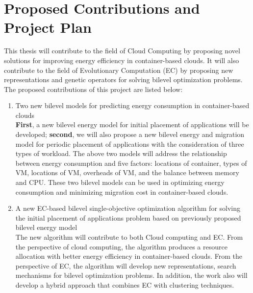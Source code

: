 \chapter{Proposed Contributions and Project Plan}\label{C:con}

This thesis will contribute to the field of Cloud Computing by proposing novel solutions for improving energy efficiency in container-based clouds. It will also contribute to the field of Evolutionary Computation (EC) by proposing new representations and genetic operators for solving bilevel optimization problems. The proposed contributions of this project are listed below:
 
\begin{enumerate}
	\item Two new bilevel models for predicting energy consumption in container-based clouds \\

	 \textbf{First}, a new bilevel energy model for initial placement of applications will be developed; \textbf{second}, we will also propose a new bilevel energy and migration model for periodic placement of applications with the consideration of three types of workload. The above two models will address the relationship between energy consumption and five factors: locations of container, types of VM, locations of VM, overheads of VM, and the balance between memory and CPU.  
	These two bilevel models can be used in optimizing energy consumption and minimizing migration cost in container-based clouds.

	\item A new EC-based bilevel single-objective optimization algorithm for solving the initial placement of applications problem based on previously proposed bilevel energy model \\

	The new algorithm will contribute to both Cloud computing and EC. From the perspective of cloud computing, the algorithm produces a resource allocation with better energy efficiency in container-based clouds. From the perspective of EC, the algorithm will develop new representations, search mechanisms for bilevel optimization problems. In addition, the work also will develop a hybrid approach that combines EC with clustering techniques.


\end{enumerate}
